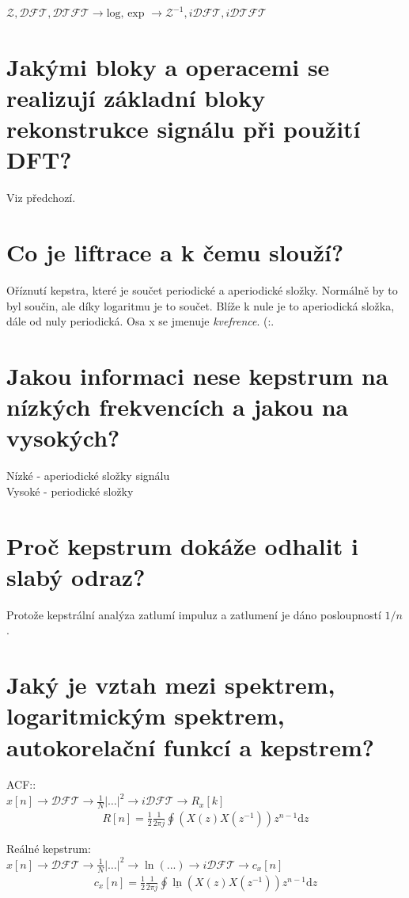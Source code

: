 \documentclass[a4paper,12pt]{article}   %
\newcommand{\mt}[1]{$#1$}
\newcommand{\dd}{\text{d}}
\begin{document}
\mt{\mathscr{Z}, \mathscr{DFT}, \mathscr{DTFT} \rightarrow \text{log, exp }\rightarrow \mathscr{Z}^{-1}, i\mathscr{DFT}, i\mathscr{DTFT}}


\section{Jakými bloky a operacemi se realizují základní bloky rekonstrukce signálu při použití DFT?}

Viz předchozí.


\section{Co je liftrace a k čemu slouží?}

Oříznutí kepstra, které je součet periodické a aperiodické složky. Normálně by to byl součin, ale díky logaritmu je to součet. Blíže k nule je to aperiodická složka, dále od nuly periodická. Osa x se jmenuje \textit{kvefrence}. (:.


\section{Jakou informaci nese kepstrum na nízkých frekvencích a jakou na vysokých?}

Nízké - aperiodické složky signálu\\
Vysoké - periodické složky


\section{Proč kepstrum dokáže odhalit i slabý odraz?}

Protože kepstrální analýza zatlumí impuluz a zatlumení je dáno posloupností \mt{1/n}.


\section{Jaký je vztah mezi spektrem, logaritmickým spektrem, autokorelační funkcí a kepstrem?}

ACF::\\
\mt{x[n] \rightarrow \mathscr{DFT} \rightarrow \frac{1}{N}|\dots|^2 \rightarrow i\mathscr{DFT} \rightarrow R_x[k]}
\begin{align*}
        R[n] = \frac{1}{2}\frac{1}{2\pi j}\oint (X(z)X(z^{-1}))z^{n-1}\dd z
\end{align*}


Reálné kepstrum:\\
\mt{x[n] \rightarrow \mathscr{DFT} \rightarrow \frac{1}{N}|\dots|^2 \rightarrow \ln (...) \rightarrow i\mathscr{DFT} \rightarrow c_x[n]}
\begin{align*}
        c_x[n] = \frac{1}{2}\frac{1}{2\pi j}\oint \underline{\ln}(X(z)X(z^{-1}))z^{n-1}\dd z
\end{align*}
\end{document}
